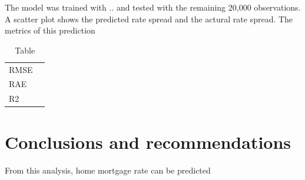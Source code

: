\documentclass[a4paper,10pt,notitlepage]{article}
\begin{document}
The model was trained with .. and tested with the remaining 20,000 observations. A scatter plot shows the predicted rate spread and the actural rate spread.
The metrics of this prediction

\begin{table}
\centering
\caption{ Table}
\label{tab:metrics}
\begin{tabular}{lr}
\hline
 RMSE    &      \\
 RAE     &      \\
 R2      &      \\
\hline
\end{tabular} 
\end{table}

\section{Conclusions and recommendations}

From this analysis, home mortgage rate can be predicted 
\end{document}
